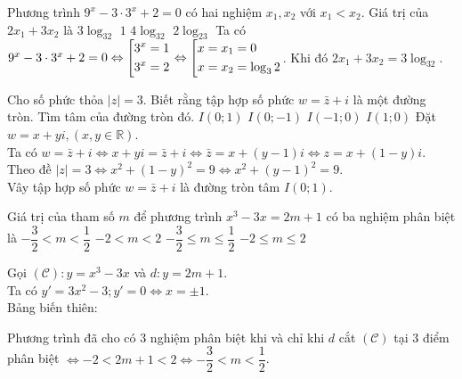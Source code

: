\begin{ex}%
Phương trình $9^x-3\cdot 3^x+2=0$ có hai nghiệm $x_1, x_2$ với $x_1<x_2$. Giá trị của $2x_1+3x_2$ là
\choice
{\True $3\log_32$}
{$1$}
{$4\log_32$}
{$2\log_23$}
\loigiai
{Ta có $9^x-3\cdot 3^x+2=0\Leftrightarrow\left[\begin{aligned}&3^x=1\\&3^x=2\end{aligned}\right.\Leftrightarrow\left[\begin{aligned}&x=x_1=0\\&x=x_2=\log_32\end{aligned}\right.$. Khi đó $2x_1+3x_2=3\log_32$.}
\end{ex}

\begin{ex}%
Cho số phức thỏa $|z|=3$. Biết rằng tập hợp số phức $w=\bar{z}+i$ là một đường tròn. Tìm tâm của đường tròn đó.
\choice
{\True $I(0;1)$}
{$I(0;-1)$}
{$I(-1;0)$}
{$I(1;0)$}
\loigiai
{Đặt $w=x+yi, (x, y\in\mathbb{R})$.\\Ta có $w=\bar{z}+i\Leftrightarrow x+yi=\bar{z}+i\Leftrightarrow \bar{z}=x+(y-1)i\Leftrightarrow z=x+(1-y)i$.\\Theo đề $|z|=3\Leftrightarrow x^2+(1-y)^2=9\Leftrightarrow x^2+(y-1)^2=9$.\\
Vây tập hợp số phức $w=\bar{z}+i$ là đường tròn tâm $I(0; 1)$.}
\end{ex}

\begin{ex}%
Giá trị của tham số $m$ để phương trình $x^3-3x=2m+1$ có ba nghiệm phân biệt là
\choice
{\True $-\dfrac{3}{2}<m<\dfrac{1}{2}$}
{$-2<m<2$}
{$-\dfrac{3}{2}\leq m\leq\dfrac{1}{2}$}
{$-2\leq m\leq 2$}
\loigiai
{Gọi $\left(\mathscr{C}\right): y=x^3-3x$ và $d: y=2m+1$.\\Ta có $y'=3x^2-3; y'=0\Leftrightarrow x=\pm 1$.\\Bảng biến thiên: 
\begin{center}
\end{center}
Phương trình đã cho có $3$ nghiệm phân biệt khi và chỉ khi $d$ cắt $(\mathscr{C})$ tại $3$ điểm phân biệt $\Leftrightarrow -2<2m+1<2\Leftrightarrow -\dfrac{3}{2}<m<\dfrac{1}{2}$.
}
\end{ex}

